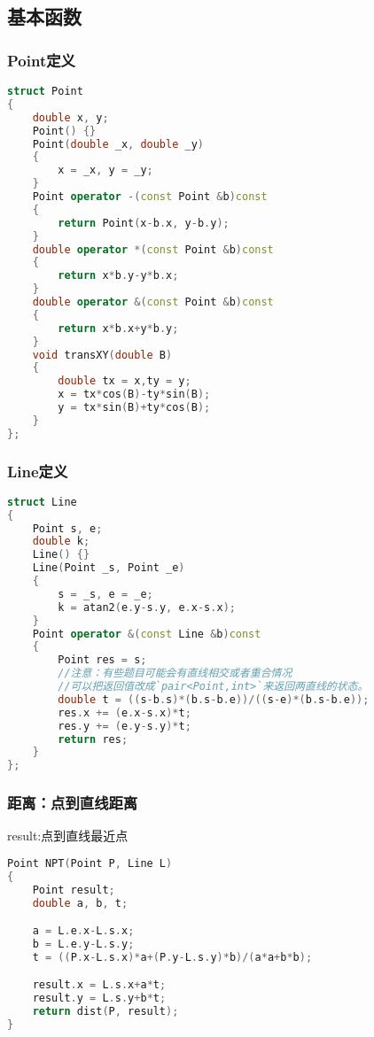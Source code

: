 \subsection{基本函数}
	\subsubsection{Point定义}
		\begin{lstlisting}[language=c++]
struct Point
{
	double x, y;
	Point() {}
	Point(double _x, double _y)
	{
		x = _x, y = _y;
	}
	Point operator -(const Point &b)const
	{
		return Point(x-b.x, y-b.y);
	}
	double operator *(const Point &b)const
	{
		return x*b.y-y*b.x;
	}
	double operator &(const Point &b)const
	{
		return x*b.x+y*b.y;
	}
	void transXY(double B)
	{
		double tx = x,ty = y;
		x = tx*cos(B)-ty*sin(B);
		y = tx*sin(B)+ty*cos(B);
	}
};
		\end{lstlisting}
		
	\subsubsection{Line定义}
		\begin{lstlisting}[language=c++]
struct Line
{
	Point s, e;
	double k;
	Line() {}
	Line(Point _s, Point _e)
	{
		s = _s, e = _e;
		k = atan2(e.y-s.y, e.x-s.x);
	}
	Point operator &(const Line &b)const
	{
		Point res = s;
		//注意：有些题目可能会有直线相交或者重合情况
		//可以把返回值改成`pair<Point,int>`来返回两直线的状态。
		double t = ((s-b.s)*(b.s-b.e))/((s-e)*(b.s-b.e));
		res.x += (e.x-s.x)*t;
		res.y += (e.y-s.y)*t;
		return res;
	}
};
		\end{lstlisting}
		
	\subsubsection{距离：点到直线距离}
	result:点到直线最近点
	\begin{lstlisting}[language=c++]
Point NPT(Point P, Line L)  
{ 
	Point result; 
	double a, b, t; 

	a = L.e.x-L.s.x; 
	b = L.e.y-L.s.y; 
	t = ((P.x-L.s.x)*a+(P.y-L.s.y)*b)/(a*a+b*b); 

	result.x = L.s.x+a*t; 
	result.y = L.s.y+b*t; 
	return dist(P, result); 
}
	\end{lstlisting}
	
